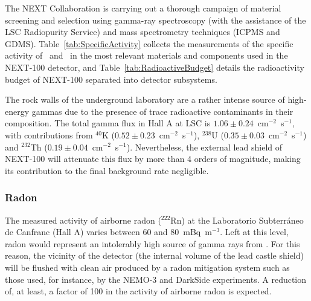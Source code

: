 

The NEXT Collaboration is carrying out a thorough campaign of material screening and selection using gamma-ray spectroscopy (with the assistance of the LSC Radiopurity Service) and mass spectrometry techniques (ICPMS and GDMS). Table~\ref{tab:SpecificActivity} collects the measurements of the specific activity of \Tl\ and \Bi\ in the most relevant materials and components used in the NEXT-100 detector, and Table~\ref{tab:RadioactiveBudget} details the radioactivity budget of NEXT-100 separated into detector subsystems.

The rock walls of the underground laboratory are a rather intense source of high-energy gammas due to the presence of trace radioactive contaminants in their composition. The total gamma flux in Hall A at LSC is $1.06\pm0.24$~cm$^{-2}$~s$^{-1}$, with contributions from $^{40}$K ($0.52\pm0.23$~cm$^{-2}$~s$^{-1}$), $^{238}$U ($0.35\pm0.03$~cm$^{-2}$~s$^{-1}$) and $^{232}$Th ($0.19\pm0.04$~cm$^{-2}$~s$^{-1}$). Nevertheless, the external lead shield of NEXT-100 will attenuate this flux by more than 4 orders of magnitude, making its contribution to the final background rate negligible. 

\subsubsection*{Radon}

The measured activity of airborne radon ($^{222}$Rn) at the Laboratorio Subterr\'aneo de Canfranc (Hall A) varies between 60 and 80~mBq~m$^{-3}$. Left at this level, radon would represent an intolerably high source of gamma rays from \Bi. For this reason, the vicinity of the detector (the internal volume of the lead castle shield) will be flushed with clean air produced by a radon mitigation system such as those used, for instance, by the NEMO-3 and DarkSide experiments. A reduction of, at least, a factor of 100 in the activity of airborne radon is expected.

